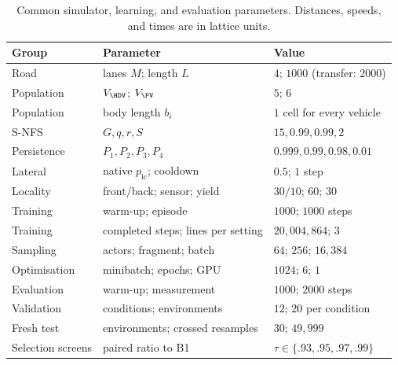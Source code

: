\begin{table}[pos=tbp]
\centering
\caption{Common simulator, learning, and evaluation parameters. Distances, speeds, and times are in lattice units.}
\label{tab:parameters}
\begingroup
\small
\begin{tabular}{@{}lll@{}}
\toprule
Group & Parameter & Value \\
\midrule
Road & lanes $M$; length $L$ & $4$; $1000$ (transfer: $2000$) \\
Population & $V_{\HDV}$; $V_{\PV}$ & $5$; $6$ \\
Population & body length $b_i$ & $1$ cell for every vehicle \\
S-NFS & $G,q,r,S$ & $15,0.99,0.99,2$ \\
Persistence & $P_1,P_2,P_3,P_4$ & $0.999,0.99,0.98,0.01$ \\
Lateral & native $p_{\mathrm{lc}}$; cooldown & $0.5$; $1$ step \\
Locality & front/back; sensor; yield & $30/10$; $60$; $30$ \\
Training & warm-up; episode & $1000$; $1000$ steps \\
Training & completed steps; lines per setting & $20{,}004{,}864$; $3$ \\
Sampling & actors; fragment; batch & $64$; $256$; $16{,}384$ \\
Optimisation & minibatch; epochs; GPU & $1024$; $6$; $1$ \\
Evaluation & warm-up; measurement & $1000$; $2000$ steps \\
Validation & conditions; environments & $12$; $20$ per condition \\
Fresh test & environments; crossed resamples & $30$; $49{,}999$ \\
Selection screens & paired ratio to B1 & $\tau\in\{.93,.95,.97,.99\}$ \\
\bottomrule
\end{tabular}
\endgroup
\end{table}
